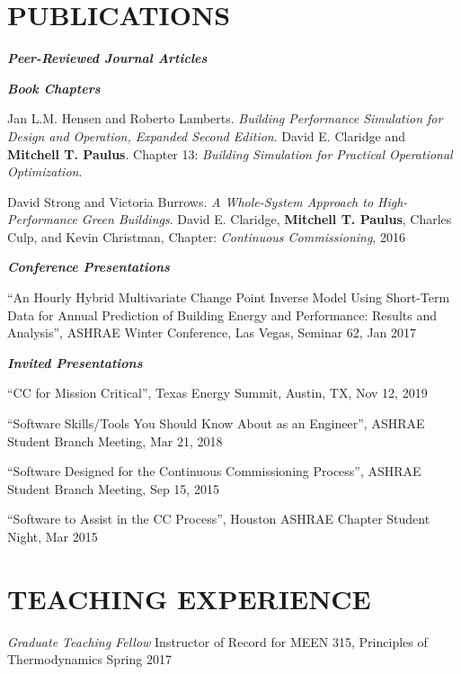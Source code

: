 \documentclass[margin]{res} %
\begin{document}
\begin{resume}
\section{PUBLICATIONS}
{\sl \textbf{Peer-Reviewed Journal Articles}}









{\sl \textbf{Book Chapters}}

Jan L.M. Hensen and Roberto Lamberts. \textit{Building Performance Simulation
for Design and Operation, Expanded Second Edition}. David E. Claridge
and \textbf{Mitchell T. Paulus}. Chapter 13: \textit{Building Simulation
for Practical Operational Optimization}.

David Strong and Victoria Burrows. \textit{A Whole-System Approach to High-Performance Green Buildings}. David E. Claridge, \textbf{Mitchell T. Paulus}, Charles Culp, and Kevin Christman, Chapter: \textit{Continuous Commissioning\textsuperscript{\textregistered{}}}, 2016

\textbf{\textit{Conference Presentations}}

``An Hourly Hybrid Multivariate Change Point Inverse  Model Using Short-Term Data for Annual Prediction of Building Energy and Performance: Results and Analysis'', ASHRAE Winter Conference, Las Vegas, Seminar 62, Jan 2017

\textbf{\textit{Invited Presentations}}

``CC\textsuperscript{\textregistered{}} for Mission Critical'', Texas Energy Summit, Austin, TX, Nov 12, 2019

``Software Skills/Tools You Should Know About as an Engineer'', ASHRAE Student Branch Meeting, Mar 21, 2018

``Software Designed for the Continuous Commissioning Process'', ASHRAE Student Branch Meeting, Sep 15, 2015

``Software to Assist in the CC Process'', Houston ASHRAE Chapter Student Night, Mar 2015

\section{TEACHING EXPERIENCE}
{\sl Graduate Teaching Fellow }\newline
Instructor of Record for MEEN 315, Principles of Thermodynamics \hfill Spring 2017


\end{resume}
\end{document}
